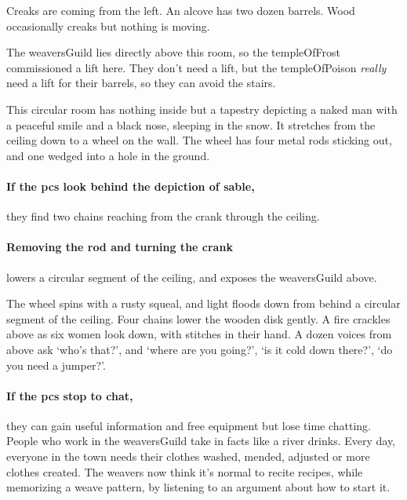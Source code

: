 \begin{multicols}{2}
\begin{boxtext}
  Creaks are coming from the left.
  An alcove has two dozen barrels.
  Wood occasionally creaks but nothing is moving.
\end{boxtext}


\begin{exampletext}
  The \gls{weaversGuild} lies directly above this room, so the \gls{templeOfFrost} commissioned a lift here.
  They don't need a lift, but the \gls{templeOfPoison} \emph{really} need a lift for their barrels, so they can avoid the stairs.
\end{exampletext}

\begin{boxtext}
  This circular room has nothing inside but a tapestry depicting a naked man with a peaceful smile and a black nose, sleeping in the snow.
  It stretches from the ceiling down to a wheel on the wall.
  The wheel has four metal rods sticking out, and one wedged into a hole in the ground.
\end{boxtext}

\paragraph{If the \glspl{pc} look behind the depiction of \gls{sable},}
they find two chains reaching from the crank through the ceiling.

\paragraph{Removing the rod and turning the crank}
lowers a circular segment of the ceiling, and exposes the \gls{weaversGuild} above.

\begin{boxtext}
  The wheel spins with a rusty squeal, and light floods down from behind a circular segment of the ceiling.
  Four chains lower the wooden disk gently.
  A fire crackles above as six women look down, with stitches in their hand.
  A dozen voices from above ask `who's that?', and `where are you going?', `is it cold down there?', `do you need a jumper?'.
\end{boxtext}

\paragraph{If the \glspl{pc} stop to chat,}
they can gain useful information and free \gls{equipment} but lose time chatting.
People who work in the \gls{weaversGuild} take in facts like a river drinks.
Every day, everyone in the town needs their clothes washed, mended, adjusted or more clothes created.
The \glspl{weaver} now think it's normal to recite recipes, while memorizing a weave pattern, by listening to an argument about how to start it.


\end{multicols}
